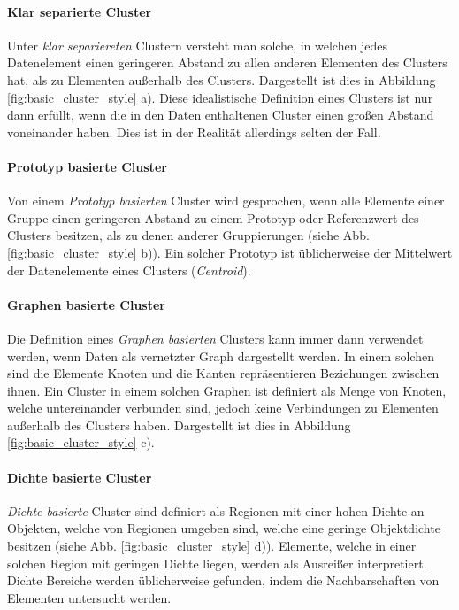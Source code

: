 \paragraph{Klar separierte Cluster}
Unter \textit{klar separiereten} Clustern versteht man solche, in welchen jedes Datenelement einen geringeren
Abstand zu allen anderen Elementen des Clusters hat, als zu Elementen außerhalb des Clusters.
Dargestellt ist dies in Abbildung \ref{fig:basic_cluster_style} a). Diese idealistische Definition eines
Clusters ist nur dann erfüllt, wenn die in den Daten enthaltenen Cluster einen großen Abstand voneinander haben.
Dies ist in der Realität allerdings selten der Fall.

\paragraph{Prototyp basierte Cluster}
Von einem \textit{Prototyp basierten} Cluster wird gesprochen, wenn alle Elemente einer Gruppe einen
geringeren Abstand zu einem Prototyp oder Referenzwert des Clusters besitzen, als zu denen anderer Gruppierungen (siehe Abb. \ref{fig:basic_cluster_style} b)).
Ein solcher Prototyp ist üblicherweise der Mittelwert der Datenelemente eines Clusters (\textit{Centroid}).

\paragraph{Graphen basierte Cluster}
Die Definition eines \textit{Graphen basierten} Clusters kann immer dann verwendet werden, wenn Daten
als vernetzter Graph dargestellt werden. In einem solchen sind die Elemente Knoten und die Kanten
repräsentieren Beziehungen zwischen ihnen. Ein Cluster in einem solchen Graphen ist definiert als Menge von
Knoten, welche untereinander verbunden sind, jedoch keine Verbindungen zu Elementen außerhalb des Clusters haben.
Dargestellt ist dies in Abbildung \ref{fig:basic_cluster_style} c).

\paragraph{Dichte basierte Cluster}
\textit{Dichte basierte} Cluster sind definiert als Regionen mit einer hohen Dichte an Objekten, welche von
Regionen umgeben sind, welche eine geringe Objektdichte besitzen (siehe Abb. \ref{fig:basic_cluster_style} d)). Elemente, welche in einer solchen Region
mit geringen Dichte liegen, werden als Ausreißer interpretiert. Dichte Bereiche werden üblicherweise
gefunden, indem die Nachbarschaften von Elementen untersucht werden.

